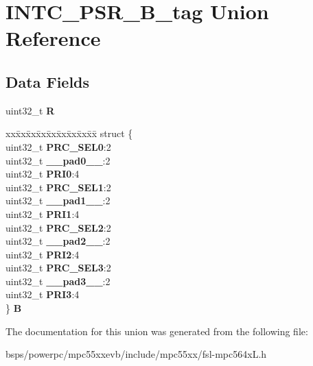 \hypertarget{unionINTC__PSR__32B__tag}{}\section{I\+N\+T\+C\+\_\+\+P\+S\+R\+\_\+B\+\_\+tag Union Reference}
\label{unionINTC__PSR__32B__tag}
\subsection*{Data Fields}
\begin{DoxyCompactItemize}
\item 
\mbox{\label{unionINTC__PSR__32B__tag_ab93c13bd7622bbadf9cb75ce7243ea92}} 
uint32\+\_\+t {\bfseries R}
\item 
\mbox{\label{unionINTC__PSR__32B__tag_ac31107c74b926557b99373fd99352bc2}} 
\begin{tabbing}
xx\=xx\=xx\=xx\=xx\=xx\=xx\=xx\=xx\=\kill
struct \{\\
\>uint32\_t {\bfseries PRC\_SEL0}:2\\
\>uint32\_t {\bfseries \_\_pad0\_\_}:2\\
\>uint32\_t {\bfseries PRI0}:4\\
\>uint32\_t {\bfseries PRC\_SEL1}:2\\
\>uint32\_t {\bfseries \_\_pad1\_\_}:2\\
\>uint32\_t {\bfseries PRI1}:4\\
\>uint32\_t {\bfseries PRC\_SEL2}:2\\
\>uint32\_t {\bfseries \_\_pad2\_\_}:2\\
\>uint32\_t {\bfseries PRI2}:4\\
\>uint32\_t {\bfseries PRC\_SEL3}:2\\
\>uint32\_t {\bfseries \_\_pad3\_\_}:2\\
\>uint32\_t {\bfseries PRI3}:4\\
\} {\bfseries B}\\

\end{tabbing}\end{DoxyCompactItemize}


The documentation for this union was generated from the following file\+:\begin{DoxyCompactItemize}
\item 
bsps/powerpc/mpc55xxevb/include/mpc55xx/fsl-\/mpc564x\+L.\+h\end{DoxyCompactItemize}
